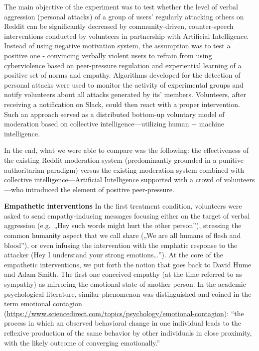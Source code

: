 \documentclass[
  10pt,
  dvipsnames,enabledeprecatedfontcommands]{scrartcl}
\begin{document}
The main objective of the experiment was to test whether the level of
verbal aggression (personal attacks) of a group of users' regularly
attacking others on Reddit can be significantly decreased by
community-driven, counter-speech interventions conducted by volunteers
in partnership with Artificial Intelligence. Instead of using negative
motivation system, the assumption was to test a positive one -
convincing verbally violent users to refrain from using cyberviolence
based on peer-pressure regulation and experiential learning of a
positive set of norms and empathy. Algorithms developed for the
detection of personal attacks were used to monitor the activity of
experimental groups and notify volunteers about all attacks generated by
its' members. Volunteers, after receiving a notification on Slack, could
then react with a proper intervention. Such an approach served as a
distributed bottom-up voluntary model of moderation based on collective
intelligence---utilizing human + machine intelligence.

In the end, what we were able to compare was the following: the
effectiveness of the existing Reddit moderation system (predominantly
grounded in a punitive authoritarian paradigm) versus the existing
moderation system combined with collective intelligence---Artificial
Intelligence supported with a crowd of volunteers---who introduced the
element of positive peer-pressure.

\textbf{Empathetic interventions} In the first treatment condition,
volunteers were asked to send empathy-inducing messages focusing either
on the target of verbal aggression (e.g.~„Hey such words might hurt the
other person''), stressing the common humanity aspect that we call share
(„We are all humans of flesh and blood''), or even infusing the
intervention with the emphatic response to the attacker (Hey I
understand your strong emotions\ldots''). At the core of the empathetic
interventions, we put forth the notion that goes back to David Hume and
Adam Smith. The first one conceived empathy (at the time referred to as
sympathy) as mirroring the emotional state of another person. In the
academic psychological literature, similar phenomenon was distinguished
and coined in the term emotional contagion
(\url{https://www.sciencedirect.com/topics/psychology/emotional-contagion}):
``the process in which an observed behavioral change in one individual
leads to the reflexive production of the same behavior by other
individuals in close proximity, with the likely outcome of converging
emotionally.''
\end{document}
